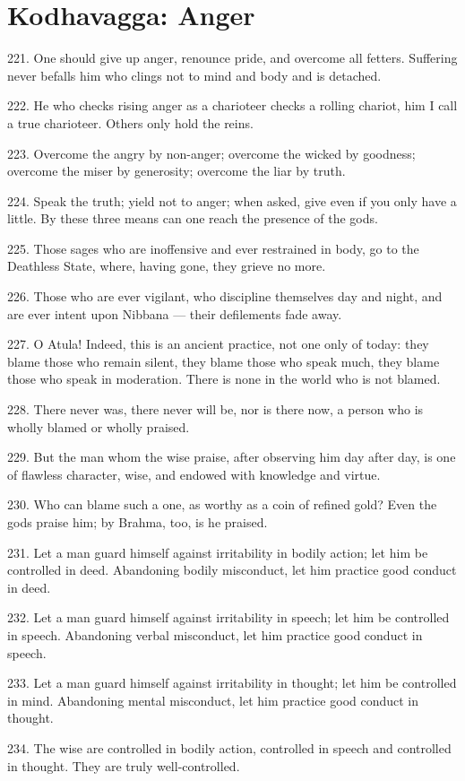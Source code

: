 \newpage
\chapter{Kodhavagga: Anger}
221. One should give up anger, renounce pride, and overcome all fetters. Suffering never befalls him who clings not to mind and body and is detached.

222. He who checks rising anger as a charioteer checks a rolling chariot, him I call a true charioteer. Others only hold the reins.

223. Overcome the angry by non-anger; overcome the wicked by goodness; overcome the miser by generosity; overcome the liar by truth.

224. Speak the truth; yield not to anger; when asked, give even if you only have a little. By these three means can one reach the presence of the gods.

225. Those sages who are inoffensive and ever restrained in body, go to the Deathless State, where, having gone, they grieve no more.

226. Those who are ever vigilant, who discipline themselves day and night, and are ever intent upon Nibbana — their defilements fade away.

227. O Atula! Indeed, this is an ancient practice, not one only of today: they blame those who remain silent, they blame those who speak much, they blame those who speak in moderation. There is none in the world who is not blamed.

228. There never was, there never will be, nor is there now, a person who is wholly blamed or wholly praised.

229. But the man whom the wise praise, after observing him day after day, is one of flawless character, wise, and endowed with knowledge and virtue.

230. Who can blame such a one, as worthy as a coin of refined gold? Even the gods praise him; by Brahma, too, is he praised.

231. Let a man guard himself against irritability in bodily action; let him be controlled in deed. Abandoning bodily misconduct, let him practice good conduct in deed.

232. Let a man guard himself against irritability in speech; let him be controlled in speech. Abandoning verbal misconduct, let him practice good conduct in speech.

233. Let a man guard himself against irritability in thought; let him be controlled in mind. Abandoning mental misconduct, let him practice good conduct in thought.

234. The wise are controlled in bodily action, controlled in speech and controlled in thought. They are truly well-controlled.
